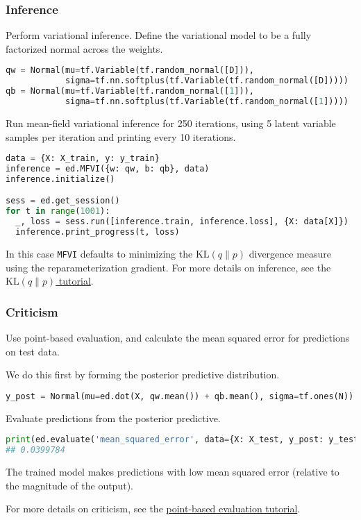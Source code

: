 \subsubsection{Inference}

Perform variational inference.
Define the variational model to be a fully factorized normal across
the weights.
\begin{lstlisting}[language=Python]
qw = Normal(mu=tf.Variable(tf.random_normal([D])),
            sigma=tf.nn.softplus(tf.Variable(tf.random_normal([D]))))
qb = Normal(mu=tf.Variable(tf.random_normal([1])),
            sigma=tf.nn.softplus(tf.Variable(tf.random_normal([1]))))
\end{lstlisting}

Run mean-field variational inference for 250 iterations, using 5
latent variable samples per iteration and printing
every 10 iterations.
\begin{lstlisting}[language=Python]
data = {X: X_train, y: y_train}
inference = ed.MFVI({w: qw, b: qb}, data)
inference.initialize()

sess = ed.get_session()
for t in range(1001):
  _, loss = sess.run([inference.train, inference.loss], {X: data[X]})
  inference.print_progress(t, loss)
\end{lstlisting}
In this case \texttt{MFVI} defaults to minimizing the
$\text{KL}(q\|p)$ divergence measure using the reparameterization
gradient.
For more details on inference, see the \href{tut_KLqp}{$\text{KL}(q\|p)$ tutorial}.


\subsubsection{Criticism}

Use point-based evaluation, and calculate the mean squared
error for predictions on test data.

We do this first by forming the posterior predictive distribution.
\begin{lstlisting}[language=Python]
y_post = Normal(mu=ed.dot(X, qw.mean()) + qb.mean(), sigma=tf.ones(N))
\end{lstlisting}

Evaluate predictions from the posterior predictive.
\begin{lstlisting}[language=Python]
print(ed.evaluate('mean_squared_error', data={X: X_test, y_post: y_test}))
## 0.0399784
\end{lstlisting}

The trained model makes predictions with low mean squared error
(relative to the magnitude of the output).

For more details on criticism, see the \href{tut_point_eval}{point-based
evaluation tutorial}.

